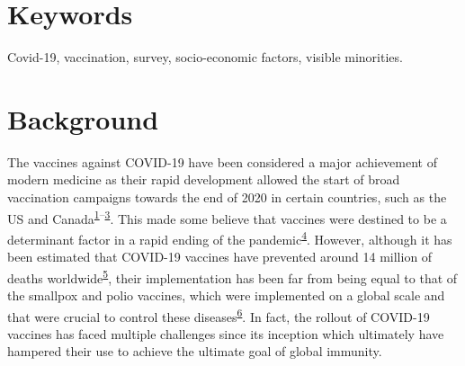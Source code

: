\documentclass[
  letterpaper,
  DIV=11,
  numbers=noendperiod]{scrartcl}
\begin{document}
\hypertarget{keywords}{%
\section*{Keywords}\label{keywords}}

Covid-19, vaccination, survey, socio-economic factors, visible
minorities.

\hypertarget{background}{%
\section{Background}\label{background}}

The vaccines against COVID-19 have been considered a major achievement
of modern medicine as their rapid development allowed the start of broad
vaccination campaigns towards the end of 2020 in certain countries, such
as the US and
Canada\textsuperscript{\protect\hyperlink{ref-davis2022}{1}--\protect\hyperlink{ref-tanne2020}{3}}.
This made some believe that vaccines were destined to be a determinant
factor in a rapid ending of the
pandemic\textsuperscript{\protect\hyperlink{ref-thelancet2021}{4}}.
However, although it has been estimated that COVID-19 vaccines have
prevented around 14 million of deaths
worldwide\textsuperscript{\protect\hyperlink{ref-watson2022}{5}}, their
implementation has been far from being equal to that of the smallpox and
polio vaccines, which were implemented on a global scale and that were
crucial to control these
diseases\textsuperscript{\protect\hyperlink{ref-kayser2021}{6}}. In
fact, the rollout of COVID-19 vaccines has faced multiple challenges
since its inception which ultimately have hampered their use to achieve
the ultimate goal of global immunity.
\end{document}
